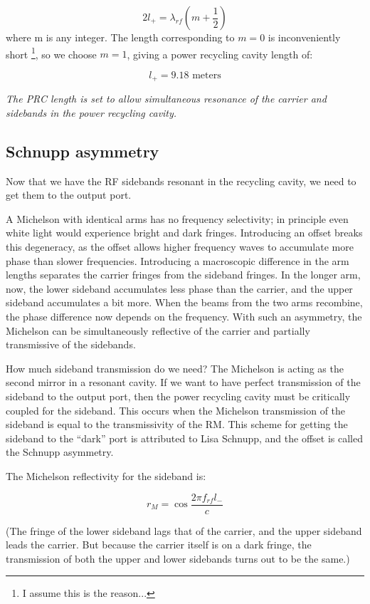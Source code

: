 \[
2l_{+}=\lambda_{rf}\left(m+\frac{1}{2}\right)
\]
where m is any integer. The length corresponding to $m=0$ is inconveniently
short%
\footnote{I assume this is the reason...%
}, so we choose $m=1$, giving a power recycling cavity length of:

\[
\boxed{{l_{+}=9.18\text{{\ meters}}}}
\]


\emph{The PRC length is set to allow simultaneous resonance of the
carrier and sidebands in the power recycling cavity.}


\subsection*{Schnupp asymmetry}

Now that we have the RF sidebands resonant in the recycling cavity,
we need to get them to the output port. 

A Michelson with identical arms has no frequency selectivity; in principle
even white light would experience bright and dark fringes. Introducing
an offset breaks this degeneracy, as the offset allows higher frequency
waves to accumulate more phase than slower frequencies. Introducing
a macroscopic difference in the arm lengths separates the carrier
fringes from the sideband fringes. In the longer arm, now, the lower
sideband accumulates less phase than the carrier, and the upper sideband
accumulates a bit more. When the beams from the two arms recombine,
the phase difference now depends on the frequency. With such an asymmetry,
the Michelson can be simultaneously reflective of the carrier and
partially transmissive of the sidebands. 

How much sideband transmission do we need? The Michelson is acting
as the second mirror in a resonant cavity. If we want to have perfect
transmission of the sideband to the output port, then the power recycling
cavity must be critically coupled for the sideband. This occurs when
the Michelson transmission of the sideband is equal to the transmissivity
of the RM. This scheme for getting the sideband to the {}``dark'' port is attributed
to Lisa Schnupp, and the offset is called the Schnupp asymmetry.

The Michelson reflectivity for the sideband is:

\begin{equation}
r_{M}=\cos\frac{2\pi f_{rf}l_{-}}{c}
\end{equation}

(The fringe of the lower sideband lags that of
the carrier, and the upper sideband leads the carrier. But because
the carrier itself is on a dark fringe, the transmission of both the
upper and lower sidebands turns out to be the same.)

